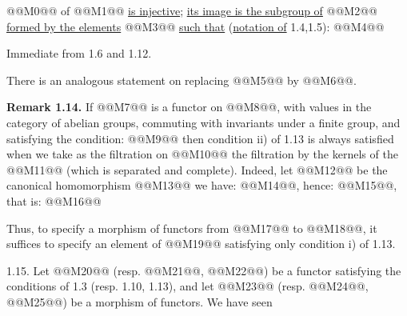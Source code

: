@@M0@@ of @@M1@@ \uline{is injective}; \uline{its image is the subgroup of} @@M2@@ \uline{formed by the elements} @@M3@@ \uline{such that} (\uline{notation of} 1.4,1.5):
@@M4@@

Immediate from 1.6 and 1.12.

There is an analogous statement on replacing @@M5@@ by @@M6@@.

\textbf{Remark 1.14.} If @@M7@@ is a functor on @@M8@@, with values in the category of abelian groups, commuting with invariants under a finite group, and satisfying the condition:
@@M9@@
then condition ii) of 1.13 is always satisfied when we take as the filtration on @@M10@@ the filtration by the kernels of the @@M11@@ (which is separated and complete). Indeed, let @@M12@@ be the canonical homomorphism
@@M13@@
we have: @@M14@@, hence: @@M15@@, that is:
@@M16@@

Thus, to specify a morphism of functors from @@M17@@ to @@M18@@, it suffices to specify an element of @@M19@@ satisfying only condition i) of 1.13.

1.15. Let @@M20@@ (resp. @@M21@@, @@M22@@) be a functor satisfying the conditions of 1.3 (resp. 1.10, 1.13), and let @@M23@@ (resp. @@M24@@, @@M25@@) be a morphism of functors. We have seen
